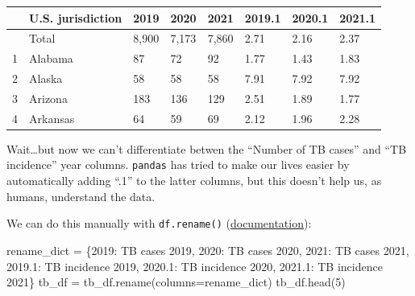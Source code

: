 \documentclass[
  letterpaper,
  DIV=11,
  numbers=noendperiod]{scrreprt}
\newenvironment{Shaded}{\begin{snugshade}}{\end{snugshade}}
\newcommand{\DecValTok}[1]{\textcolor[rgb]{0.68,0.00,0.00}{#1}}
\newcommand{\NormalTok}[1]{\textcolor[rgb]{0.00,0.23,0.31}{#1}}
\newcommand{\OperatorTok}[1]{\textcolor[rgb]{0.37,0.37,0.37}{#1}}
\newcommand{\StringTok}[1]{\textcolor[rgb]{0.13,0.47,0.30}{#1}}
\begin{document}
\begin{longtable}[]{@{}llllllll@{}}
\toprule\noalign{}
& U.S. jurisdiction & 2019 & 2020 & 2021 & 2019.1 & 2020.1 & 2021.1 \\
\midrule\noalign{}
\endhead
\bottomrule\noalign{}
\endlastfoot
0 & Total & 8,900 & 7,173 & 7,860 & 2.71 & 2.16 & 2.37 \\
1 & Alabama & 87 & 72 & 92 & 1.77 & 1.43 & 1.83 \\
2 & Alaska & 58 & 58 & 58 & 7.91 & 7.92 & 7.92 \\
3 & Arizona & 183 & 136 & 129 & 2.51 & 1.89 & 1.77 \\
4 & Arkansas & 64 & 59 & 69 & 2.12 & 1.96 & 2.28 \\
\end{longtable}

Wait\ldots but now we can't differentiate betwen the ``Number of TB
cases'' and ``TB incidence'' year columns. \texttt{pandas} has tried to
make our lives easier by automatically adding ``.1'' to the latter
columns, but this doesn't help us, as humans, understand the data.

We can do this manually with \texttt{df.rename()}
(\href{https://pandas.pydata.org/docs/reference/api/pandas.DataFrame.rename.html?highlight=rename\#pandas.DataFrame.rename}{documentation}):

\begin{Shaded}
\begin{Highlighting}[]
\NormalTok{rename\_dict }\OperatorTok{=}\NormalTok{ \{}\StringTok{\textquotesingle{}2019\textquotesingle{}}\NormalTok{: }\StringTok{\textquotesingle{}TB cases 2019\textquotesingle{}}\NormalTok{,}
               \StringTok{\textquotesingle{}2020\textquotesingle{}}\NormalTok{: }\StringTok{\textquotesingle{}TB cases 2020\textquotesingle{}}\NormalTok{,}
               \StringTok{\textquotesingle{}2021\textquotesingle{}}\NormalTok{: }\StringTok{\textquotesingle{}TB cases 2021\textquotesingle{}}\NormalTok{,}
               \StringTok{\textquotesingle{}2019.1\textquotesingle{}}\NormalTok{: }\StringTok{\textquotesingle{}TB incidence 2019\textquotesingle{}}\NormalTok{,}
               \StringTok{\textquotesingle{}2020.1\textquotesingle{}}\NormalTok{: }\StringTok{\textquotesingle{}TB incidence 2020\textquotesingle{}}\NormalTok{,}
               \StringTok{\textquotesingle{}2021.1\textquotesingle{}}\NormalTok{: }\StringTok{\textquotesingle{}TB incidence 2021\textquotesingle{}}\NormalTok{\}}
\NormalTok{tb\_df }\OperatorTok{=}\NormalTok{ tb\_df.rename(columns}\OperatorTok{=}\NormalTok{rename\_dict)}
\NormalTok{tb\_df.head(}\DecValTok{5}\NormalTok{)}
\end{Highlighting}
\end{Shaded}
\end{document}
